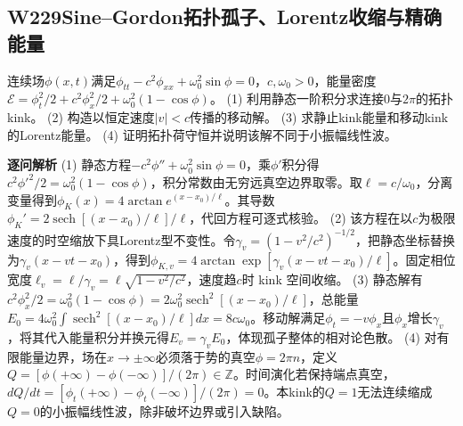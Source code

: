 \subsection*{W229\quad Sine–Gordon拓扑孤子、Lorentz收缩与精确能量}
连续场$\phi(x,t)$满足$\phi_{tt}-c^2\phi_{xx}+\omega_0^2\sin\phi=0$，$c,\omega_0>0$，能量密度$\mathcal E=\phi_t^2/2+c^2\phi_x^2/2+\omega_0^2(1-\cos\phi)$。
(1) 利用静态一阶积分求连接0与$2\pi$的拓扑kink。
(2) 构造以恒定速度$|v|<c$传播的移动解。
(3) 求静止kink能量和移动kink的Lorentz能量。
(4) 证明拓扑荷守恒并说明该解不同于小振幅线性波。
\par\textbf{逐问解析}
(1) 静态方程$-c^2\phi''+\omega_0^2\sin\phi=0$，乘$\phi'$积分得$c^2\phi'^2/2=\omega_0^2(1-\cos\phi)$，积分常数由无穷远真空边界取零。取$\ell=c/\omega_0$，分离变量得到$\phi_K(x)=4\arctan e^{(x-x_0)/\ell}$。其导数$\phi_K'=2\operatorname{sech}[(x-x_0)/\ell]/\ell$，代回方程可逐式核验。
(2) 该方程在以$c$为极限速度的时空缩放下具Lorentz型不变性。令$\gamma_v=(1-v^2/c^2)^{-1/2}$，把静态坐标替换为$\gamma_v(x-vt-x_0)$，得到$\phi_{K,v}=4\arctan\exp[\gamma_v(x-vt-x_0)/\ell]$。固定相位宽度$\ell_v=\ell/\gamma_v=\ell\sqrt{1-v^2/c^2}$，速度趋$c$时 kink 空间收缩。
(3) 静态解有$c^2\phi_x^2/2=\omega_0^2(1-\cos\phi)=2\omega_0^2\operatorname{sech}^2[(x-x_0)/\ell]$，总能量$E_0=4\omega_0^2\int\operatorname{sech}^2[(x-x_0)/\ell]dx=8c\omega_0$。移动解满足$\phi_t=-v\phi_x$且$\phi_x$增长$\gamma_v$，将其代入能量积分并换元得$E_v=\gamma_v E_0$，体现孤子整体的相对论色散。
(4) 对有限能量边界，场在$x\to\pm\infty$必须落于势的真空$\phi=2\pi n$，定义$Q=[\phi(+\infty)-\phi(-\infty)]/(2\pi)\in\mathbb Z$。时间演化若保持端点真空，$dQ/dt=[\phi_t(+\infty)-\phi_t(-\infty)]/(2\pi)=0$。本kink的$Q=1$无法连续缩成$Q=0$的小振幅线性波，除非破坏边界或引入缺陷。
\par\medskip
